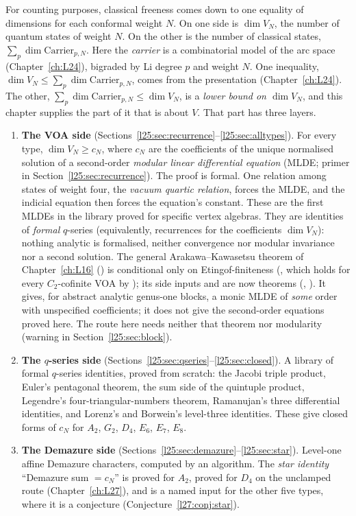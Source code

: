 For counting purposes, classical freeness comes down to one equality of dimensions for each conformal weight $N$.
On one side is $\dim V_N$, the number of quantum states of weight $N$. On the other is the number of classical
states, $\sum_p\dim\mathrm{Carrier}_{p,N}$. Here the \emph{carrier} is a combinatorial model of the arc space
(Chapter~\ref{ch:L24}), bigraded by Li degree $p$ and weight $N$. One inequality,
$\dim V_N\le\sum_p\dim\mathrm{Carrier}_{p,N}$, comes from the presentation (Chapter~\ref{ch:L24}). The other,
$\sum_p\dim\mathrm{Carrier}_{p,N}\le\dim V_N$, is a \emph{lower bound on $\dim V_N$}, and this chapter supplies the
part of it that is about $V$. That part has three layers.
\begin{enumerate}
\item \textbf{The VOA side} (Sections~\ref{l25:sec:recurrence}--\ref{l25:sec:alltypes}). For every type,
  $\dim V_N\ge c_N$, where $c_N$ are the coefficients of the unique normalised solution of a second-order
  \emph{modular linear differential equation} (MLDE; primer in Section~\ref{l25:sec:recurrence}). The proof is
  formal. One relation among states of weight four, the \emph{vacuum quartic relation}, forces the MLDE, and the
  indicial equation then forces the equation's constant. These are the first MLDEs in the library proved for specific
  vertex algebras. They are identities of \emph{formal} $q$-series (equivalently, recurrences for the coefficients
  $\dim V_N$): nothing analytic is formalised, neither convergence nor modular invariance nor a second solution. The general Arakawa--Kawasetsu theorem of Chapter~\ref{ch:L16}
  () is conditional only on
  Etingof-finiteness (, which holds for every $C_2$-cofinite VOA by );
  its side inputs  and  are now theorems (,
  ). It gives, for abstract analytic genus-one blocks, a monic MLDE of \emph{some} order with
  unspecified coefficients; it does not give the second-order equations proved here. The route here needs neither that
  theorem nor modularity (warning in Section~\ref{l25:sec:block}).
\item \textbf{The $q$-series side} (Sections~\ref{l25:sec:qseries}--\ref{l25:sec:closed}). A library of formal
  $q$-series identities, proved from scratch: the Jacobi triple product, Euler's pentagonal theorem, the
  sum side of the quintuple product, Legendre's four-triangular-numbers theorem, Ramanujan's three differential identities, and
  Lorenz's and Borwein's level-three identities. These give closed forms of $c_N$ for $A_2$, $G_2$, $D_4$, $E_6$,
  $E_7$, $E_8$.
\item \textbf{The Demazure side} (Sections~\ref{l25:sec:demazure}--\ref{l25:sec:star}). Level-one affine Demazure
  characters, computed by an algorithm. The \emph{star identity} ``Demazure sum $=c_N$'' is proved for $A_2$,
  proved for $D_4$ on the unclamped route (Chapter~\ref{ch:L27}), and is a named input for the other five types,
  where it is a conjecture (Conjecture~\ref{l27:conj:star}).
\end{enumerate}

